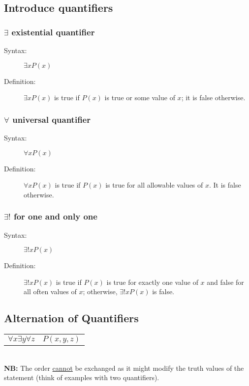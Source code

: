 \documentclass[10pt]{article}
\begin{document}
	\subsection{Introduce quantifiers}
	\subsubsection{$\exists$ existential quantifier}
	\begin{description}
		\item[Syntax:] $\exists xP(x)$
		\item[Definition:] $\exists xP(x)$ is true if $P(x)$ is true or some value of $x$; it is false otherwise.
	\end{description}
	
	\subsubsection{$\forall$ universal quantifier}
	\begin{description}
		\item[Syntax:] $\forall xP(x)$
		\item[Definition:] $\forall xP(x)$ is true if $P(x)$ is true for all allowable values of $x$. It is false otherwise.
	\end{description}
	
	\subsubsection{$\exists!$ for one and only one}
	\begin{description}
		\item[Syntax:] $\exists! xP(x)$
		\item[Definition:] $\exists! xP(x)$ is true if $P(x)$ is true for exactly one value of $x$ and false for all often values of $x$; otherwise, $\exists! xP(x)$ is false.
	\end{description}
	
	\subsection{Alternation of Quantifiers}
	\begin{tabular}{lr}
		$\forall x\exists y\forall z$ & $P(x, y, z)$ \\
	\end{tabular}
	~\\
	\textbf{NB:} The order \underline{cannot} be exchanged as it might modify the truth values of the statement (think of examples with two quantifiers).
	
\end{document}
